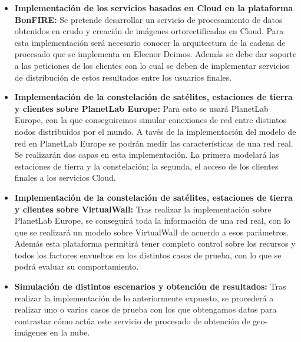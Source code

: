 \begin{itemize}

\item \textbf{Implementación de los servicios basados en Cloud en la plataforma BonFIRE:}  Se pretende desarrollar un servicio de procesamiento de datos obtenidos en crudo y creación de imágenes ortorectificadas en Cloud. Para esta implementación será necesario conocer la arquitectura de la cadena de procesado que se implementa en Elecnor Deimos. Además se debe dar soporte a las peticiones de los clientes con lo cual se deben de implementar servicios de distribución de estos resultados entre los usuarios finales.

\item \textbf{Implementación de la constelación de satélites, estaciones de tierra y clientes sobre PlanetLab Europe:}  Para esto se usará PlanetLab Europe, con la que conseguiremos simular conexiones de red entre distintos nodos distribuidos por el mundo.
A tavés de la implementación del modelo de red en PlanetLab Europe se podrán medir las características de una red real. Se realizarán dos capas en esta implementación. La primera modelará las estaciones de tierra y la constelación; la segunda, el acceso de los clientes finales  a los servicios Cloud.

\item \textbf{Implementación de la constelación de satélites, estaciones de tierra y clientes sobre VirtualWall:} Tras realizar la implementación sobre PlanetLab Europe, se conseguirá toda la información de una red real, con lo que se realizará un modelo sobre VirtualWall de acuerdo a esos parámetros. Además esta plataforma permitirá tener completo control sobre los recursos y todos los factores envueltos en los distintos casos de prueba, con lo que se podrá evaluar su comportamiento.

\item \textbf{Simulación de distintos escenarios y obtención de resultados:} Tras realizar la implementación de lo anteriormente expuesto, se procederá a realizar uno o varios casos de prueba con los que obtengamos datos para contrastar cómo actúa este servicio de procesado de obtención de geo-imágenes en la nube.



\end{itemize}







